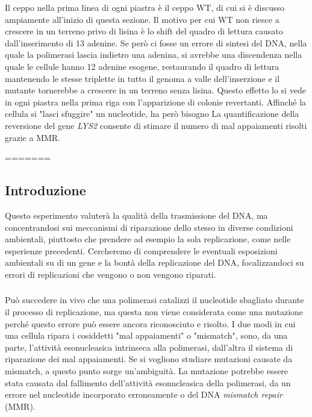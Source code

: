  Il ceppo nella prima linea di ogni piastra è il ceppo WT, di cui si è discusso ampiamente all'inizio di questa sezione. Il motivo per cui WT non riesce a crescere in un terreno privo di lisina è lo shift del quadro di lettura causato dall'inserimento di 13 adenine. Se però ci fosse un errore di sintesi del DNA, nella quale la polimerasi lascia indietro una adenina, si avrebbe una discendenza nella quale le cellule hanno 12 adenine esogene, restaurando il quadro di lettura mantenendo le stesse triplette in tutto il genoma a valle dell'inserzione e il mutante tornerebbe a crescere in un terreno senza lisina. Questo effetto lo si vede in ogni piastra nella prima riga con l'apparizione di colonie revertanti. Affinché la cellula si "lasci sfuggire" un nucleotide, ha però bisogno La quantificazione della reversione del gene \textit{LYS2} consente di stimare il numero di mal appaiamenti risolti grazie a MMR.
 
 
=======
\subsection*{Introduzione}
Questo esperimento valuterà la qualità della trasmissione del DNA, ma concentrandosi sui meccanismi di riparazione dello stesso in diverse condizioni ambientali, piuttosto che prendere ad esempio la sola replicazione, come nelle esperienze precedenti. 
Cercheremo di comprendere le eventuali esposizioni ambientali su di un gene e la bontà della replicazione del DNA, focalizzandoci su errori di replicazioni che vengono o non vengono riparati. 

 \subsubsection*{}
 Può succedere in vivo che una polimerasi catalizzi il nucleotide sbagliato durante il processo di replicazione, ma questa non viene considerata come una mutazione perché questo errore può essere ancora riconosciuto e risolto. 
I due modi in cui una cellula ripara i cosiddetti "mal appaiamenti" o "mismatch", sono, da una parte, l'attività esonucleasica intrinseca alla polimerasi, dall'altra il sistema di riparazione dei mal appaiamenti. 
Se si vogliono studiare mutazioni causate da mismatch, a questo punto sorge un'ambiguità. 
La mutazione potrebbe essere stata causata dal fallimento dell'attività esonucleasica della polimerasi, da un errore nel nucleotide incorporato erroneamente o del DNA \textit{mismatch repair} (MMR). 

